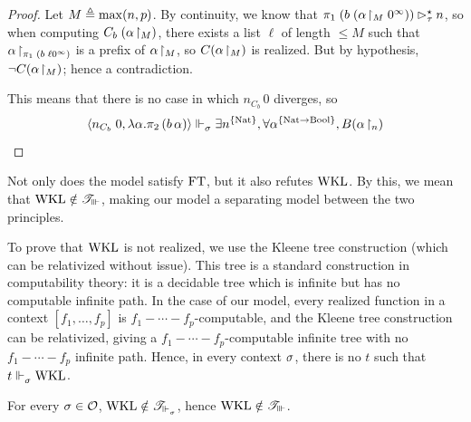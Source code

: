 \documentclass[a4paper,UKenglish,cleveref, autoref, thm-restate]{lipics-v2021}
\begin{document}
\begin{proof}
  Let $M \triangleq \max(n,p)$.
  By continuity, we know that $\pi_1\;(b\;({\alpha}\!\upharpoonright_{M} 0^\infty)) \rhd^{\star}_{\tau}{} n$, so when computing $C_b\;({\alpha}\!\upharpoonright_{M})$, there exists a list $\ell$ of length $\leq M$ such that ${\alpha}\!\upharpoonright_{{\pi_1\;(b\;\ell 0^\infty)}}$ is a prefix of ${\alpha}\!\upharpoonright_{M}$, so $C({\alpha}\!\upharpoonright_{M})$ is realized. But by hypothesis, $\lnot C({\alpha}\!\upharpoonright_{M})$; hence a contradiction.

  This means that there is no case in which $n_{C_b}\,0$ diverges, so
  \[\langle n_{C_b}\;0 , \lambda \alpha.\pi_2 \,(b\, \alpha)\rangle \Vdash_{\sigma}^{} \exists n^{\{\mathrm{Nat}\}}, \forall \alpha^{\{\mathrm{Nat} \to \mathrm{Bool}\}}, B({\alpha}\!\upharpoonright_{n})\qedhere\]

\end{proof}

Not only does the model satisfy $\mathrm{FT}$, but it also refutes $\mathrm{WKL}$. By this, we mean that $\mathrm{WKL}\notin\mathscr T_{\Vvdash}$, making our model a separating model between the two principles.

To prove that $\mathrm{WKL}$ is not realized, we use the Kleene tree \cite{Kleene1953-KLERFA-3} construction (which can be relativized without issue). This tree is a standard construction in computability theory: it is a decidable tree which is infinite but has no computable infinite path. In the case of our model, every realized function in a context $[f_1,\ldots,f_p]$ is $f_1-\cdots-f_p$-computable, and the Kleene tree construction can be relativized, giving a $f_1-\cdots-f_p$-computable infinite tree with no $f_1-\cdots-f_p$ infinite path. Hence, in every context $\sigma$, there is no $t$ such that $t\Vdash_{\sigma}^{} \mathrm{WKL}$.




\begin{theorem}
  For every $\sigma \in \mathcal O$, $\mathrm{WKL}\notin \mathscr T_{\Vdash_{\sigma}^{}}$, hence $\mathrm{WKL}\notin \mathscr T_{\Vvdash}$.
\end{theorem}
\end{document}
